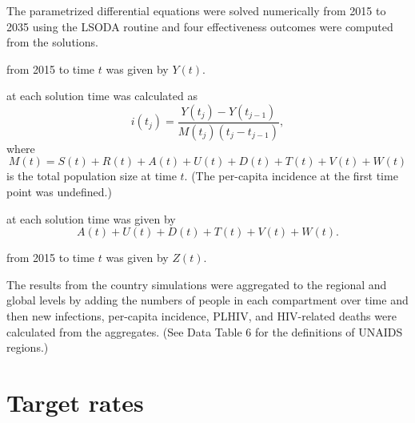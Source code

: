 \documentclass{article}
\begin{document}
The parametrized differential equations were solved numerically from
2015 to 2035 using the LSODA
routine\cite{odepack, scipy, medlock2016-git} and four effectiveness
outcomes were computed from the solutions.
\begin{description}[labelsep=0.6ex]
\item[Cumulative new infections] from 2015 to time $t$ was given by
  $Y(t)$.

\item[Per-capita incidence] at each solution time was calculated as
  \begin{equation}
    i(t_j) = \frac{Y(t_j) - Y(t_{j - 1})}{M(t_j) (t_j - t_{j - 1})},
  \end{equation}
  where
  \begin{equation}
    M(t) = S(t) + R(t) + A(t) + U(t) + D(t) + T(t) + V(t) + W(t)
  \end{equation}
  is the total population size at time $t$.  (The per-capita incidence
  at the first time point was undefined.)

\item[PLHIV] at each solution time was given by
  \begin{equation}
    A(t) + U(t) + D(t) + T(t) + V(t) + W(t).
  \end{equation}

\item[Cumulative AIDS-related deaths] from 2015 to time $t$ was given
  by $Z(t)$.

\end{description}

The results from the country simulations were aggregated to the
regional and global levels by adding the numbers of people in each
compartment over time and then new infections, per-capita incidence,
PLHIV, and HIV-related deaths were calculated from the aggregates.
(See Data Table 6 for the definitions of UNAIDS regions.)


\section{Target rates}
\label{targets}
\end{document}
